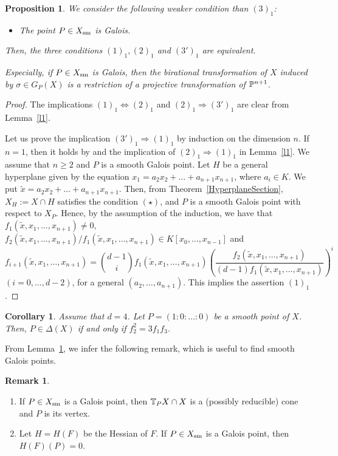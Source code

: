 \documentclass[10pt,oneside]{amsart}
\newtheorem{proposition}{Proposition}
\newtheorem{corollary}{Corollary}
\theoremstyle{definition}
\newtheorem{remark}{Remark}
\begin{document}
\begin{proposition} \label{l2}
We consider the following weaker condition than $(3)_1$: 
\begin{itemize}
\item[(3')$_1$] The point $P \in X_{\rm sm}$ is Galois. 
\end{itemize}
Then, the three conditions $(1)_1, (2)_1$ and $(3')_1$ are equivalent. 

Especially, if $P \in X_{\rm sm}$ is Galois, then the birational transformation of $X$ induced by $\sigma \in G_P(X)$ is a restriction of a projective transformation of $\Bbb P^{n+1}$. 
\end{proposition}

\begin{proof}
The implications  $(1)_1 \Leftrightarrow (2)_1$ and $(2)_1 \Rightarrow (3')_1$ are clear from Lemma~\ref{l1}. 

Let us prove the implication $(3')_1 \Rightarrow (1)_1$ by induction on the dimension $n$. 
If $n=1$, then it holds by \cite[Proposition~5]{yoshihara1} and the implication of $(2)_1 \Rightarrow (1)_1$ in Lemma~\ref{l1}.  
We assume that $n \geq 2$ and $P$ is a smooth Galois point. Let $H$ be a general hyperplane given by the equation $x_1= a_2 x_2 + \dots + a_{n+1} x_{n+1}$, where $a_i \in K$. 
We put $\tilde{x} = a_2 x_2 + \dots + a_{n+1} x_{n+1}$. 
Then, from Theorem~\ref{HyperplaneSection}, $X_H := X \cap H$ satisfies the condition $(\star)$, and $P$ is a smooth Galois point with respect to $X_P$. 
Hence, by the assumption of the induction, we have that $f_1(\tilde{x}, x_1, \dots, x_{n+1}) \ne 0$, $f_2(\tilde{x}, x_1, \dots, x_{n+1})/f_1(\tilde{x}, x_1, \dots, x_{n+1}) \in K[x_0, \dots, x_{n-1}]$ and 
$$ 
f_{i+1}(\tilde{x}, x_1, \dots, x_{n+1}) 
=\binom{d-1}{i} f_1(\tilde{x}, x_1, \dots, x_{n+1}) \left(\frac{f_2(\tilde{x}, x_1, \dots, x_{n+1})}{(d-1)f_1(\tilde{x}, x_1, \dots, x_{n+1})}\right)^i
$$ 
$(i=0, \dots, d-2)$, for a general $(a_2, \dots, a_{n+1})$. 
This implies the assertion $(1)_1$. 
\end{proof}

\begin{corollary} \label{f_2^2=3f_1f_3}
Assume that $d=4$. Let $P=(1:0:\dots:0)$ be a smooth point of $X$. Then, $P \in \Delta(X)$ if and only if $f_2^2=3f_1f_3$.
\end{corollary}

From Lemma~\ref{l2}, we infer the following remark, which is useful to find smooth Galois points. 
\begin{remark} \label{re1} $ $
\begin{enumerate}

\item If $P \in X_{\rm sm}$ is a Galois point, then $\Bbb T_PX \cap X$ is a (possibly reducible) cone and $P$ is its vertex. 
\item Let $H=H(F)$ be the Hessian of $F$. 
If $P \in X_{\rm sm}$ is a Galois point, then $H(F)(P)=0$. 
\end{enumerate}
\end{remark}
\end{document}
